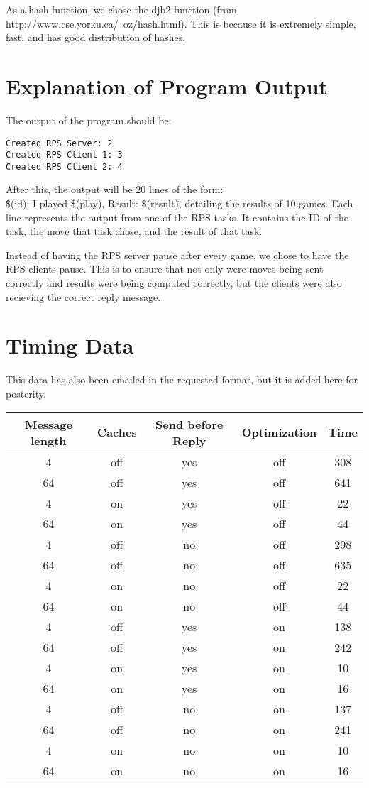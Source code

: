 \documentclass{article}
\begin{document}
    As a hash function, we chose the djb2 function (from http://www.cse.yorku.ca/~oz/hash.html). This is because it is extremely simple, fast, and has good distribution of hashes.
\section{Explanation of Program Output}
The output of the program should be:
\begin{verbatim}
Created RPS Server: 2
Created RPS Client 1: 3
Created RPS Client 2: 4
\end{verbatim}
After this, the output will be 20 lines of the form: \\\"\$(id): I played \$(play), Result: \$(result)\", detailing the results of 10 games.
Each line represents the output from one of the RPS tasks. It contains the ID of the task, the move that task chose, and the result of that task.

Instead of having the RPS server pause after every game, we chose to have the RPS clients pause.
This is to ensure that not only were moves being sent correctly and results were being computed correctly, but the clients were also recieving the correct reply message.
\section{Timing Data}
This data has also been emailed in the requested format, but it is added here for posterity.\\
\begin{tabular}{|c|c|c|c|c|}
\hline
Message length & Caches & Send before Reply & Optimization & Time\\
\hline
4   &    off  &   yes   &      off       &      308\\
64  &    off  &   yes   &      off       &      641\\
4   &    on   &   yes   &      off       &      22\\
64  &    on   &   yes   &      off       &      44\\
4   &    off  &   no    &      off       &      298\\
64  &    off  &   no    &      off       &      635\\
4   &    on   &   no    &      off       &      22\\
64  &    on   &   no    &      off       &      44\\
4   &    off  &   yes   &      on        &      138\\
64  &    off  &   yes   &      on        &      242\\
4   &    on   &   yes   &      on        &      10\\
64  &    on   &   yes   &      on        &      16\\
4   &    off  &   no    &      on        &      137\\
64  &    off  &   no    &      on        &      241\\
4   &    on   &   no    &      on        &      10\\
64  &    on   &   no    &      on        &      16\\
\hline
\end{tabular}
\end{document}
